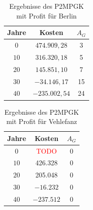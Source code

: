 \documentclass[11pt,a4paper]{article}
\newcommand{\TODO}{\textcolor{red}{TODO}}
\theoremstyle{my_th_style1}
\begin{document}
\begin{table}[!htbp]
	\centering
	\begin{tabular}{c|c|c}
		\centering
		Jahre & Kosten & $A_G$ \\	
		\hline
		$0$   	 &  \(474.909,28\) & 3  \\
		$10$ 	&  \(316.320,18\) & 5  \\
		$20$   	&   \(145.851,10\) & 7  \\
		$30$    &   $ -34.146,17$	& 15  \\
		$40$    & $-235.002,54$ &  24 \\
	\end{tabular}
	\caption{Ergebnisse des P2MPGK mit Profit f\"ur Berlin}
	\label{P2MPGKProfitB}
\end{table}

\begin{table}[!htbp]
	\centering
	\begin{tabular}{c|c|c}
		\centering
		Jahre & Kosten & $A_G$ \\	
		\hline
		$0$   	 & \TODO  &0  \\
		$10$ 	&  426.328 & 0  \\
		$20$   	&  205.048  & 0  \\
		$30$    & $-16.232$& 0  \\
		$40$    &  $-237.512$ & 0 \\
	\end{tabular}
	\caption{Ergebnisse des P2MPGK mit Profit f\"ur Vehlefanz} 
	\label{P2MPGKProfitV}
\end{table}


\thispagestyle{empty}
\end{document}
